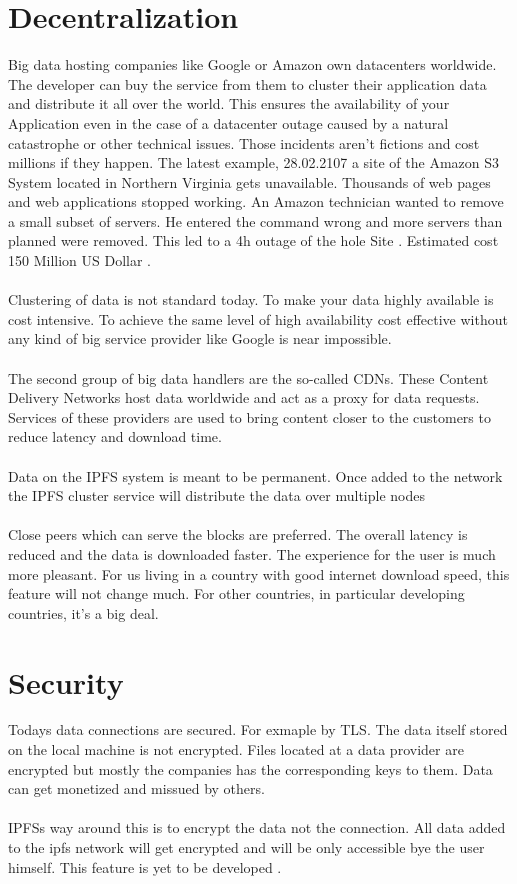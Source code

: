 \documentclass[a4paper,11pt, oneside]{report}
\theoremstyle{definition}
\begin{document}
\section{Decentralization}
Big data hosting companies like Google or Amazon own datacenters worldwide. The developer can buy the service from them to cluster their application data and distribute it all over the world. This ensures the availability of your Application even in the case of a datacenter outage caused by a natural catastrophe or other technical issues. Those incidents aren't fictions and cost millions if they happen. The latest example, 28.02.2107 a site of the Amazon S3 System located in Northern Virginia gets unavailable. Thousands of web pages and web applications stopped working. An Amazon technician wanted to remove a small subset of servers. He entered the command wrong and more servers than planned were removed. This led to a 4h outage of the hole Site \cite{AWSOutage}. Estimated cost 150 Million US Dollar \cite{AWSOutageCost}.\\\\
Clustering of data is not standard today. To make your data highly available is cost intensive. To achieve the same level of high availability cost effective without any kind of big service provider like Google is near impossible.\\\\
The second group of big data handlers are the so-called CDNs. These Content Delivery Networks host data worldwide and act as a proxy for data requests. Services of these providers are used to bring content closer to the customers to reduce latency and download time.\\ \\
Data on the IPFS system is meant to be permanent.  Once added to the network the IPFS cluster service will distribute the data over multiple nodes\\ \\
Close peers which can serve the blocks are preferred. The overall latency is reduced and the data is downloaded faster. The experience for the user is much more pleasant. For us living in a country with good internet download speed, this feature will not change much. For other countries, in particular developing countries, it's a big deal.

\section{Security}
Todays data connections are secured. For exmaple by TLS. The data itself stored on the local machine is not encrypted. Files located at a data provider are encrypted but mostly the companies has the corresponding keys to them. Data can get monetized and missued by others.\\ \\ 
IPFSs way around this is to encrypt the data not the connection. All data added to the ipfs network will get encrypted and will be only accessible bye the user himself. This feature is yet to be developed \cite{Encryption}.
\end{document}
